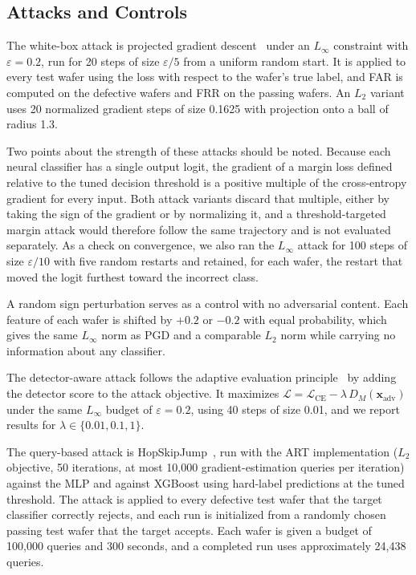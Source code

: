 \documentclass[preprint,12pt,authoryear]{elsarticle}
\begin{document}
\subsection{Attacks and Controls}
The white-box attack is projected gradient descent~\citep{madry2018} under an $L_\infty$ constraint with $\varepsilon=0.2$, run for 20 steps of size $\varepsilon/5$ from a uniform random start. It is applied to every test wafer using the loss with respect to the wafer's true label, and FAR is computed on the defective wafers and FRR on the passing wafers. An $L_2$ variant uses 20 normalized gradient steps of size 0.1625 with projection onto a ball of radius 1.3.

Two points about the strength of these attacks should be noted. Because each neural classifier has a single output logit, the gradient of a margin loss defined relative to the tuned decision threshold is a positive multiple of the cross-entropy gradient for every input. Both attack variants discard that multiple, either by taking the sign of the gradient or by normalizing it, and a threshold-targeted margin attack would therefore follow the same trajectory and is not evaluated separately. As a check on convergence, we also ran the $L_\infty$ attack for 100 steps of size $\varepsilon/10$ with five random restarts and retained, for each wafer, the restart that moved the logit furthest toward the incorrect class.

A random sign perturbation serves as a control with no adversarial content. Each feature of each wafer is shifted by $+0.2$ or $-0.2$ with equal probability, which gives the same $L_\infty$ norm as PGD and a comparable $L_2$ norm while carrying no information about any classifier.

The detector-aware attack follows the adaptive evaluation principle~\citep{carlini2017detect,carlini2019eval,tramer2020} by adding the detector score to the attack objective. It maximizes $\mathcal{L} = \mathcal{L}_{\text{CE}} - \lambda\, D_M(\mathbf{x}_{\text{adv}})$ under the same $L_\infty$ budget of $\varepsilon=0.2$, using 40 steps of size 0.01, and we report results for $\lambda \in \{0.01, 0.1, 1\}$.

The query-based attack is HopSkipJump~\citep{chen2020hsja}, run with the ART implementation ($L_2$ objective, 50 iterations, at most 10,000 gradient-estimation queries per iteration) against the MLP and against XGBoost using hard-label predictions at the tuned threshold. The attack is applied to every defective test wafer that the target classifier correctly rejects, and each run is initialized from a randomly chosen passing test wafer that the target accepts. Each wafer is given a budget of 100,000 queries and 300 seconds, and a completed run uses approximately 24,438 queries.
\end{document}
